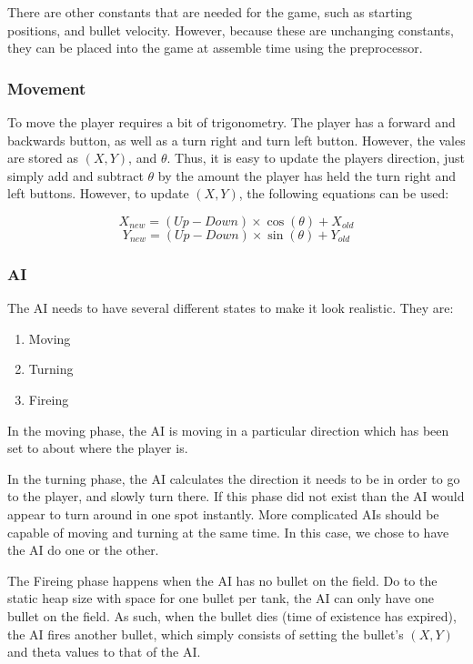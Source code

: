 \documentclass[onecolumn]{IEEEtran}
\begin{document}
There are other constants that are needed for the game, such as starting positions, and bullet velocity.  However, because these are unchanging constants, they can be placed into the game at assemble time using the preprocessor.

\subsubsection{Movement}
To move the player requires a bit of trigonometry.  The player has a forward and backwards button, as well as a turn right and turn left button.  However, the vales are stored as $(X,Y)$, and $\theta$.  Thus, it is easy to update the players direction, just simply add and subtract $\theta$ by the amount the player has held the turn right and left buttons.  However, to update $(X,Y)$, the following equations can be used:

\begin{equation}
	X_{new} = (Up-Down)\times \cos(\theta) + X_{old}
\end{equation}
\begin{equation}
	Y_{new} = (Up-Down)\times \sin(\theta) + Y_{old}
\end{equation}

\subsubsection{AI}
The AI needs to have several different states to make it look realistic.  They are:

\begin{enumerate}
	\item Moving
	\item Turning
	\item Fireing
\end{enumerate}

In the moving phase, the AI is moving in a particular direction which has been set to about where the player is.

In the turning phase, the AI calculates the direction it needs to be in order to go to the player, and slowly turn there.  If this phase did not exist than the AI would appear to turn around in one spot instantly.  More complicated AIs should be capable of moving and turning at the same time.  In this case, we chose to have the AI do one or the other.

The Fireing phase happens when the AI has no bullet on the field.  Do to the static heap size with space for one bullet per tank, the AI can only have one bullet on the field.  As such, when the bullet dies (time of existence has expired), the AI fires another bullet, which simply consists of setting the bullet's $(X,Y)$ and theta values to that of the AI.
\end{document}
